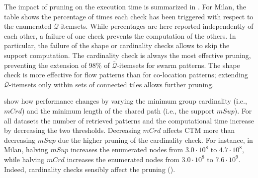 \documentclass[
]{ceurart}
\renewcommand{\sf}[1]{\textsf{\textup{#1}}}
\begin{document}
The impact of pruning on the execution time is summarized in .
For \sf{Milan}, the table shows the percentage of times each check has been triggered with respect to the enumerated $\bar{\mathcal{Q}}$-itemsets. While percentages are here reported independently of each other, a failure of one check prevents the computation of the others. In particular, the failure of the shape or cardinality checks allows to skip the support computation. 
The cardinality check is always the most effective pruning, preventing the extension of 98\% of $\bar{\mathcal{Q}}$-itemsets for swarm patterns.
The shape check is more effective for flow patterns than for co-location patterns; extending $\bar{\mathcal{Q}}$-itemsets only within sets of connected tiles allows further pruning.

 show how performance changes by varying the minimum group cardinality (i.e., $mCrd$) and the minimum length of the shared path (i.e., the support $mSup$). 
For all datasets the number of retrieved patterns and the computational time increase by decreasing the two thresholds.
Decreasing $mCrd$ affects CTM more than decreasing $mSup$ due the higher pruning of the cardinality check.
For instance, in \sf{Milan}, halving $mSup$ increases the enumerated nodes from $3.0 \cdot 10^{8}$ to $4.7 \cdot 10^{8}$, while halving $mCrd$ increases the enumerated nodes from $3.0 \cdot 10^{8}$ to $7.6 \cdot 10^{9}$. Indeed, cardinality checks sensibly affect the pruning ().
\end{document}

